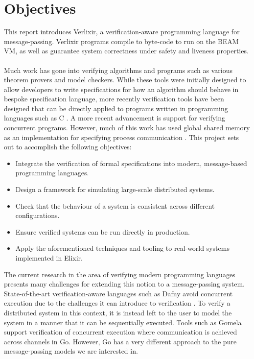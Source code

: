\section{Objectives}
This report introduces Verlixir, a verification-aware programming language for message-passing. Verlixir programs compile to byte-code to run on the BEAM VM, as well as guarantee system correctness under safety and liveness properties.
\\ \\
Much work has gone into verifying algorithms and programs such as various theorem provers and model checkers. While these tools were initially designed to allow developers to write specifications for how an algorithm should behave in bespoke specification language, more recently verification tools have been designed that can be directly applied to programs written in programming languages such as C \cite{c_to_promela}. A more recent advancement is support for verifying concurrent programs. However, much of this work has used global shared memory as an implementation for specifying process communication \cite{java_pathfinder}. This project sets out to accomplish the following objectives:
\begin{itemize}
    \item Integrate the verification of formal specifications into modern, message-based programming languages.
    \item Design a framework for simulating large-scale distributed systems.
    \item Check that the behaviour of a system is consistent across different configurations.
    \item Ensure verified systems can be run directly in production.
    \item Apply the aforementioned techniques and tooling to real-world systems implemented in Elixir.
\end{itemize}
The current research in the area of verifying modern programming languages presents many challenges for extending this notion to a message-passing system. State-of-the-art verification-aware languages such as Dafny avoid concurrent execution due to the challenges it can introduce to verification \cite{dafny_concurrency}. To verify a distributed system in this context, it is instead left to the user to model the system in a manner that it can be sequentially executed. Tools such as Gomela \cite{gomela} support verification of concurrent execution where communication is achieved across channels in Go. However, Go has a very different approach to the pure message-passing models we are interested in.
